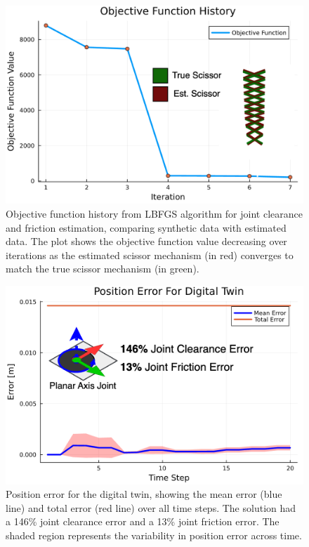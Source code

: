 \begin{figure}
    \centering
    \includegraphics[width=\linewidth]{Figures/simulation_to_simulation_sys_id.drawio.png}
    \caption{Objective function history from LBFGS algorithm for joint clearance and friction estimation, comparing synthetic data with estimated data. The plot shows the objective function value decreasing over iterations as the estimated scissor mechanism (in red) converges to match the true scissor mechanism (in green).}
    \label{fig:sim_to_sim-LBFGS}
\end{figure}
\begin{figure}
    \centering
    \includegraphics[width=\linewidth]{Figures/simulation_to_simulation_error.drawio.png}
    \caption{Position error for the digital twin, showing the mean error (blue line) and total error (red line) over all time steps. The solution had a 146\% joint clearance error and a 13\% joint friction error. The shaded region represents the variability in position error across time.}
    \label{fig:sim_to_sim-Error}
\end{figure}
